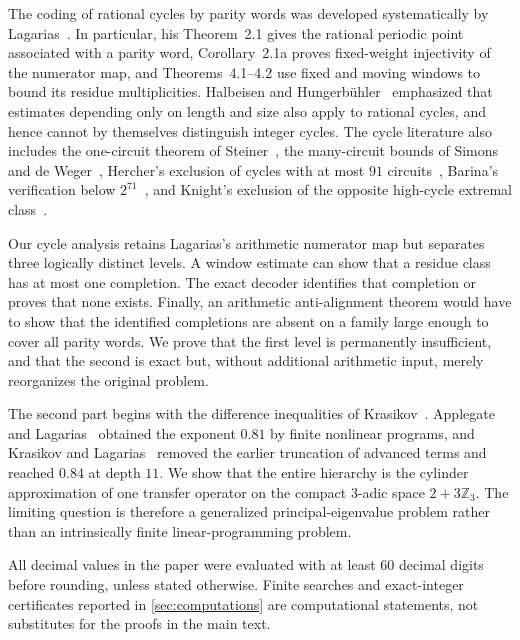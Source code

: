 \documentclass[11pt]{amsart}
\numberwithin{equation}{section}
\begin{document}
The coding of rational cycles by parity words was developed systematically by Lagarias~\cite{Lagarias1990}.  In particular, his Theorem~2.1 gives the rational periodic point associated with a parity word, Corollary~2.1a proves fixed-weight injectivity of the numerator map, and Theorems~4.1--4.2 use fixed and moving windows to bound its residue multiplicities.  Halbeisen and Hungerb\"uhler~\cite{HalbeisenHungerbuehler1997} emphasized that estimates depending only on length and size also apply to rational cycles, and hence cannot by themselves distinguish integer cycles.  The cycle literature also includes the one-circuit theorem of Steiner~\cite{Steiner1978}, the many-circuit bounds of Simons and de Weger~\cite{SimonsDeWeger2005}, Hercher's exclusion of cycles with at most $91$ circuits~\cite{Hercher2023}, Barina's verification below $2^{71}$~\cite{Barina2025}, and Knight's exclusion of the opposite high-cycle extremal class~\cite{Knight2026}.

Our cycle analysis retains Lagarias's arithmetic numerator map but separates three logically distinct levels.  A window estimate can show that a residue class has at most one completion.  The exact decoder identifies that completion or proves that none exists.  Finally, an arithmetic anti-alignment theorem would have to show that the identified completions are absent on a family large enough to cover all parity words.  We prove that the first level is permanently insufficient, and that the second is exact but, without additional arithmetic input, merely reorganizes the original problem.

The second part begins with the difference inequalities of Krasikov~\cite{Krasikov1989}.  Applegate and Lagarias~\cite{ApplegateLagarias1995II} obtained the exponent $0.81$ by finite nonlinear programs, and Krasikov and Lagarias~\cite{KrasikovLagarias2003} removed the earlier truncation of advanced terms and reached $0.84$ at depth $11$.  We show that the entire hierarchy is the cylinder approximation of one transfer operator on the compact $3$-adic space $2+3\mathbb Z_3$.  The limiting question is therefore a generalized principal-eigenvalue problem rather than an intrinsically finite linear-programming problem.

All decimal values in the paper were evaluated with at least $60$ decimal digits before rounding, unless stated otherwise.  Finite searches and exact-integer certificates reported in \cref{sec:computations} are computational statements, not substitutes for the proofs in the main text.
\end{document}
